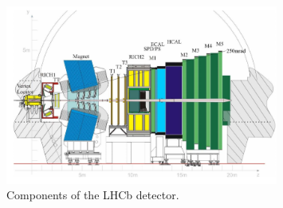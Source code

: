 \begin{figure}[!htb]
    \centering
    \includegraphics[width=0.8\textwidth]{graphics/lhcb.png}
    \caption{Components of the LHCb detector. \cite{sample_cpv}}
    \label{f1}
  \end{figure}



